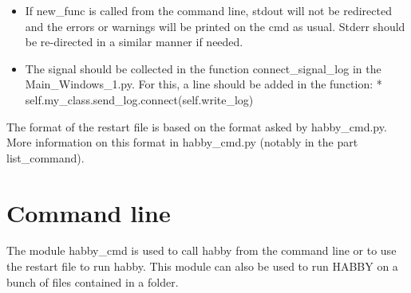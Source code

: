 \documentclass[letterpaper,10pt,english]{sphinxmanual}
\begin{document}
\begin{itemize}
\item {} 
If new\_func is called from the command line, stdout will not be redirected and the errors or warnings will be printed on the cmd as usual.  Stderr should be re-directed in a similar manner if needed.

\item {} 
The signal should be collected in the function connect\_signal\_log in the Main\_Windows\_1.py.  For this, a line should be added in the function:
*       self.my\_class.send\_log.connect(self.write\_log)

\end{itemize}


The format of the restart file is based on the format asked by habby\_cmd.py. More information on this format in habby\_cmd.py
(notably in the part list\_command).


\section{Command line}
\label{\detokenize{index:command-line}}
The module habby\_cmd is used to call habby from the command line or to use the restart file to run habby. This
module can also be used to run HABBY on a bunch of files contained in a folder.
\label{\detokenize{index:module-habby_cmd}}
\end{document}
